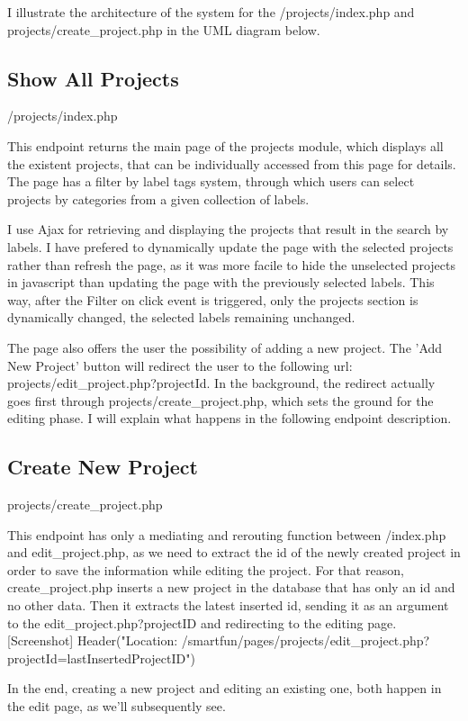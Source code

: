 I illustrate the architecture of the system for the /projects/index.php and projects/create\_project.php in the UML diagram below.


\subsection{Show All Projects}
/projects/index.php

This endpoint returns the main page of the projects module, which displays all the existent projects, that can be individually accessed from this page for details. 
The page has a filter by label tags system, through which users can select projects by categories from a given collection of labels. 

I use Ajax for retrieving and displaying the projects that result in the search by labels. I have prefered to dynamically update the page with the selected projects rather than refresh the page, as it was more facile to hide the unselected projects in javascript than updating the page with the previously selected labels. This way, after the Filter on click event is triggered, only the projects section is dynamically changed, the selected labels remaining unchanged.

The page also offers the user the possibility of adding a new project. The 'Add New Project' button will redirect the user to the following url: projects/edit\_project.php?{projectId}. In the background, the redirect actually goes first through  projects/create\_project.php, which sets the ground for the editing phase. I will explain what happens in the following endpoint description.


\subsection{Create New Project}
projects/create\_project.php

This endpoint has only a mediating and rerouting function between /index.php and edit\_project.php, as we need to extract the id of the newly created project in order to save the information while editing the project. For that reason, create\_project.php inserts a new project in the database that has only an id and no other data. Then it extracts the latest inserted id, sending it as an argument to the edit\_project.php?{projectID} and redirecting to the editing page.
[Screenshot] Header("Location: /smartfun/pages/projects/edit\_project.php?projectId=lastInsertedProjectID")

In the end, creating a new project and editing an existing one, both happen in the edit page, as we'll subsequently see.

